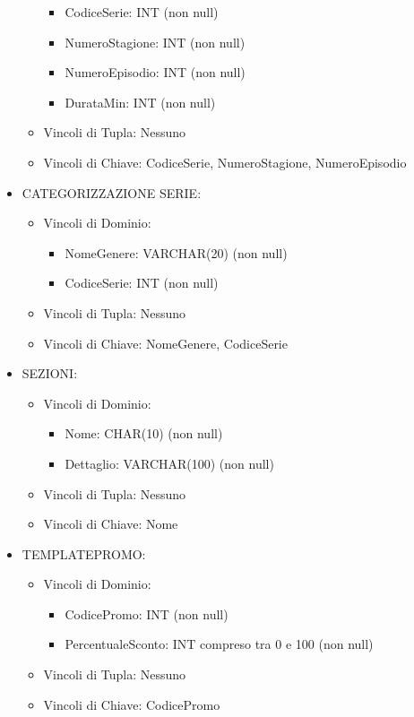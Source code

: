 \documentclass[a4paper,12pt]{report}
\begin{document}
\begin{itemize}
\begin{itemize}
		\begin{itemize}
			\item CodiceSerie: INT (non null)
			\item NumeroStagione: INT (non null)
			\item NumeroEpisodio: INT (non null)
			\item DurataMin: INT (non null)
		\end{itemize}
		\item Vincoli di Tupla: Nessuno
		\item Vincoli di Chiave: CodiceSerie, NumeroStagione, NumeroEpisodio
	\end{itemize}
	\item CATEGORIZZAZIONE SERIE:
	\begin{itemize}
		\item Vincoli di Dominio:
		\begin{itemize}
			\item NomeGenere: VARCHAR(20) (non null)
			\item CodiceSerie: INT (non null)
		\end{itemize}
		\item Vincoli di Tupla: Nessuno
		\item Vincoli di Chiave: NomeGenere, CodiceSerie
	\end{itemize}
	\item SEZIONI:
	\begin{itemize}
		\item Vincoli di Dominio:
		\begin{itemize}
			\item Nome: CHAR(10) (non null)
			\item Dettaglio: VARCHAR(100) (non null)
		\end{itemize}
		\item Vincoli di Tupla: Nessuno
		\item Vincoli di Chiave: Nome
	\end{itemize}
	\item TEMPLATEPROMO:
	\begin{itemize}
		\item Vincoli di Dominio:
		\begin{itemize}
			\item CodicePromo: INT (non null)
			\item PercentualeSconto: INT compreso tra 0 e 100 (non null)
		\end{itemize}
		\item Vincoli di Tupla: Nessuno
		\item Vincoli di Chiave: CodicePromo

\end{itemize}
\end{itemize}
\end{document}
